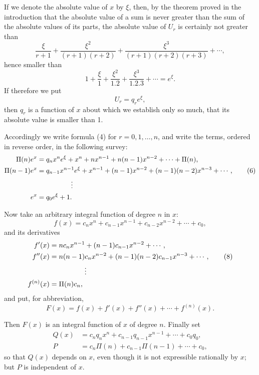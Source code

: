 \documentclass[11pt]{article}
\begin{document}
If we denote the absolute value of $x$ by $\xi$, then, by the theorem proved in the introduction that the absolute value of a sum is never greater than the sum of the absolute values of its parts, the absolute value of $U_r$ is certainly not greater than
\[
\frac{\xi}{r+1}
+\frac{\xi^2}{(r+1)(r+2)}
+\frac{\xi^3}{(r+1)(r+2)(r+3)}
+\cdots,
\]
hence smaller than
\[
1+\frac{\xi}{1}+\frac{\xi^2}{1.2}+\frac{\xi^3}{1.2.3}+\cdots=e^\xi.
\]
If therefore we put
\[
U_r=q_re^\xi,
\]
then $q_r$ is a function of $x$ about which we establish only so much, that its absolute value is smaller than 1.

Accordingly we write formula (4) for $r=0,1,\ldots,n$, and write the terms, ordered in reverse order, in the following survey:
\begin{align}
\Pi(n)e^x&=q_nx^n e^\xi+x^n+nx^{n-1}+n(n-1)x^{n-2}+\cdots+\Pi(n),\notag\\
\Pi(n-1)e^x&=q_{n-1}x^{n-1}e^\xi+x^{n-1}+(n-1)x^{n-2}
 +(n-1)(n-2)x^{n-3}+\cdots,\tag{6}\\
&\hspace{5em}\vdots\notag\\
e^x&=q_0e^\xi+1.\notag
\end{align}

Now take an arbitrary integral function of degree $n$ in $x$:
\begin{equation}\tag{7}
f(x)=c_nx^n+c_{n-1}x^{n-1}+c_{n-2}x^{n-2}+\cdots+c_0,
\end{equation}
and its derivatives
\begin{align}
f'(x)&=nc_nx^{n-1}+(n-1)c_{n-1}x^{n-2}+\cdots,\\
f''(x)&=n(n-1)c_nx^{n-2}+(n-1)(n-2)c_{n-1}x^{n-3}+\cdots,\tag{8}\\
&\hspace{5em}\vdots\notag\\
f^{(n)}(x)&=\Pi(n)c_n,\notag
\end{align}
and put, for abbreviation,
\begin{equation}\tag{9}
F(x)=f(x)+f'(x)+f''(x)+\cdots+f^{(n)}(x).
\end{equation}

Then $F(x)$ is an integral function of $x$ of degree $n$. Finally set
\begin{align}
Q(x)&=c_nq_nx^n+c_{n-1}q_{n-1}x^{n-1}+\cdots+c_0q_0,\tag{10}\\
P&=c_n\Pi(n)+c_{n-1}\Pi(n-1)+\cdots+c_0,\tag{11}
\end{align}
so that $Q(x)$ depends on $x$, even though it is not expressible rationally by $x$; but $P$ is independent of $x$.
\end{document}
